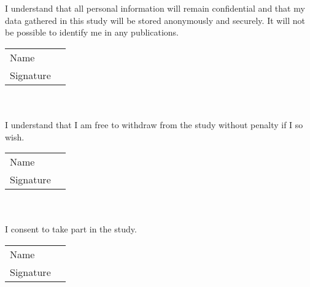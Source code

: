 \documentclass{article}
\begin{document}
        I understand that all personal information will remain confidential and that my data gathered in this study will be stored anonymously and securely. It will not be possible to identify me in any publications. \\

        \begin{tabular}{@{}p{.5in}p{3.5in}@{}}
            Name & \hrulefill \\
            Signature & \hrulefill \\
        \end{tabular} \\
        \\

        I understand that I am free to withdraw from the study without penalty if I so wish.\\

        \begin{tabular}{@{}p{.5in}p{3.5in}@{}}
            Name & \hrulefill \\
            Signature & \hrulefill \\
        \end{tabular} \\
        \\

        I consent to take part in the study.\\

        \begin{tabular}{@{}p{.5in}p{3.5in}@{}}
            Name & \hrulefill \\
            Signature & \hrulefill \\
        \end{tabular} \\
\end{document}
